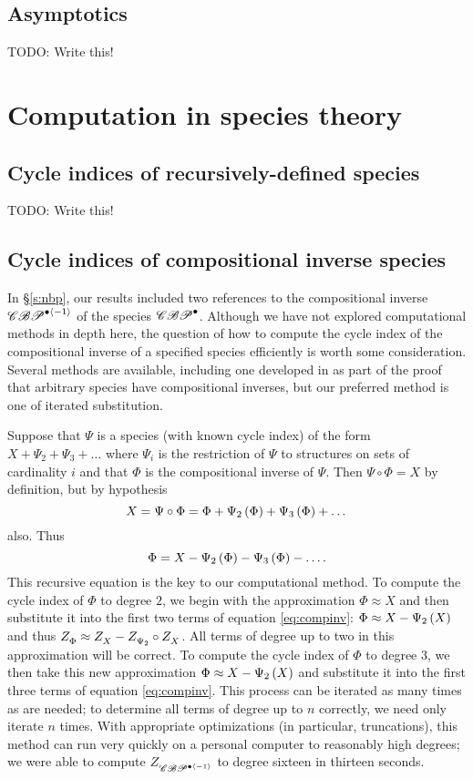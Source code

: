 \documentclass[sectionflow,singlespace,twoside,boldmathhdr,draft]{brandiss} %
\numberwithin{section}{chapter}
\numberwithin{figure}{chapter}
\begin{document}
\section{Asymptotics}
TODO: Write this!

\appendix
\chapter{Computation in species theory}\label{c:comp}
\section{Cycle indices of recursively-defined species}\label{s:comprecurs}
TODO: Write this!

\section{Cycle indices of compositional inverse species}\label{s:compinv}
In \S \ref{s:nbp}, our results included two references to the compositional inverse $\mathscr{CBP}^{\bullet \left\langle {-1} \right\rangle}$ of the species $\mathscr{CBP}^{\bullet}$.
Although we have not explored computational methods in depth here, the question of how to compute the cycle index of the compositional inverse of a specified species efficiently is worth some consideration.
Several methods are available, including one developed in \cite[4.2.19]{bll:species} as part of the proof that arbitrary species have compositional inverses, but our preferred method is one of iterated substitution.

Suppose that $\Psi$ is a species (with known cycle index) of the form $X + \Psi_{2} + \Psi_{3} + \dots$ where $\Psi_{i}$ is the restriction of $\Psi$ to structures on sets of cardinality $i$ and that $\Phi$ is the compositional inverse of $\Psi$.
Then $\Psi \circ \Phi = X$ by definition, but by hypothesis
\begin{equation*}
  X = \Psi \circ \Phi = \Phi + \Psi_{2} \left( {\Phi} \right) + \Psi_{3} \left( {\Phi} \right) + \dots
\end{equation*}
also. Thus
\begin{equation}
  \label{eq:compinv}
  \Phi = X - \Psi_{2} \left( {\Phi} \right) - \Psi_{3} \left( {\Phi} \right) - \dots.
\end{equation}
This recursive equation is the key to our computational method.
To compute the cycle index of $\Phi$ to degree $2$, we begin with the approximation $\Phi \approx X$ and then substitute it into the first two terms of equation \eqref{eq:compinv}: $\Phi \approx X - \Psi_{2} \left( {X} \right)$ and thus $ Z_{\Phi}^{}  \approx  Z_{X}^{}  -  Z_{\Psi_{2}}^{}  \circ  Z_{X}^{} $.
All terms of degree up to two in this approximation will be correct.
To compute the cycle index of $\Phi$ to degree $3$, we then take this new approximation $\Phi \approx X - \Psi_{2} \left( {X} \right)$ and substitute it into the first three terms of equation \eqref{eq:compinv}.
This process can be iterated as many times as are needed; to determine all terms of degree up to $n$ correctly, we need only iterate $n$ times.
With appropriate optimizations (in particular, truncations), this method can run very quickly on a personal computer to reasonably high degrees; we were able to compute $ Z_{\mathscr{CBP}^{\bullet \left\langle {-1} \right\rangle}}^{} $ to degree sixteen in thirteen seconds.
\end{document}
